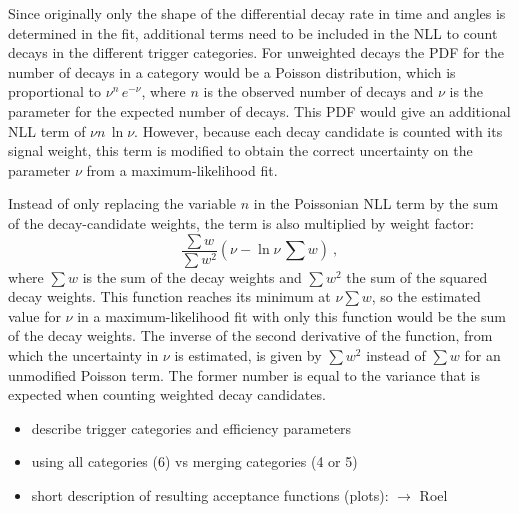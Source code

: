 Since originally only the shape of the differential decay rate in time and angles is determined in the fit, additional terms need to be
included in the NLL to count decays in the different trigger categories. For unweighted decays the PDF for the number of decays in a
category would be a Poisson distribution, which is proportional to $\nu^n\,e^{-\nu}$, where $n$ is the observed number of decays and $\nu$
is the parameter for the expected number of decays. This PDF would give an additional NLL term of $\nu$\textminus$n\,\ln\nu$. However,
because each decay candidate is counted with its signal weight, this term is modified to obtain the correct uncertainty on the parameter
$\nu$ from a maximum-likelihood fit.

Instead of only replacing the variable $n$ in the Poissonian NLL term by the sum of the decay-candidate weights, the term is also
multiplied by weight factor:
\begin{equation}
  \frac{\sum w}{\sum w^2}\left( \nu - \ln\nu\,\sum w \right)\ ,
\end{equation}
where $\sum w$ is the sum of the decay weights and $\sum w^2$ the sum of the squared decay weights. This function reaches its minimum at
$\nu$\texteq$\sum w$, so the estimated value for $\nu$ in a maximum-likelihood fit with only this function would be the sum of the decay
weights. The inverse of the second derivative of the function, from which the uncertainty in $\nu$ is estimated, is given by $\sum w^2$
instead of $\sum w$ for an unmodified Poisson term. The former number is equal to the variance that is expected when counting weighted
decay candidates.

\begin{itemize}
  \item describe trigger categories and efficiency parameters
  \item using all categories (6) vs merging categories (4 or 5)
  \item short description of resulting acceptance functions (plots): $\longrightarrow$ Roel
\end{itemize}


